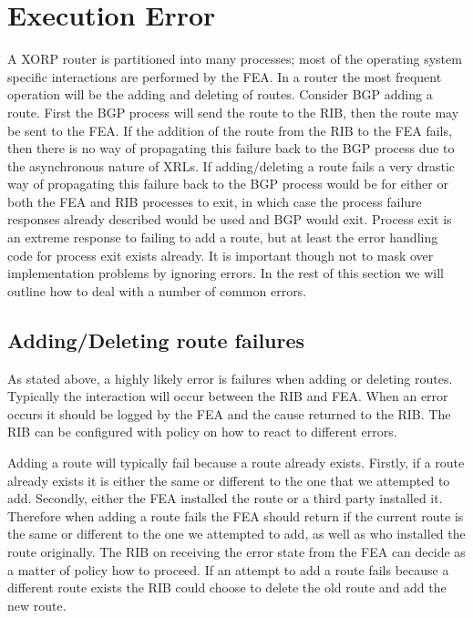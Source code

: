 \documentclass[11pt]{article}
\begin{document}
\section{Execution Error}

A XORP router is partitioned into many processes; most of the operating
system specific interactions are performed by the FEA. In a router the
most frequent operation will be the adding and deleting of routes.
Consider BGP adding a route. First the BGP process will send the route
to the RIB, then the route may be sent to the FEA. If the addition of the
route from the RIB to the FEA fails, then there is no way of
propagating this failure back to the BGP process due to the
asynchronous nature of XRLs. If adding/deleting a route fails a very
drastic way of propagating this failure back to the BGP process would
be for either or both the FEA and RIB processes to exit, in which case
the process failure responses already described would be used and BGP
would exit. Process exit is an extreme response to failing
to add a route, but at least the error handling code for process exit
exists already. It is important though not
to mask over implementation problems by ignoring errors. In the rest
of this section we will outline how to deal with a number of common
errors.

\subsection{Adding/Deleting route failures}

As stated above, a highly likely error is failures when adding or
deleting routes. Typically the interaction will occur between the RIB
and FEA. When an error occurs it should be logged by the FEA and the
cause returned to the RIB. The RIB can be configured with policy on
how to react to different errors.

Adding a route will typically fail because a route already exists.
Firstly, if a route already exists it is either the same or different
to the one that we attempted to add. Secondly, either the FEA
installed the route or a third party installed it. Therefore when
adding a route fails the FEA should return if the current route is the
same or different to the one we attempted to add, as well as who
installed the route originally. The RIB on receiving the error state
from the FEA can decide as a matter of policy how to proceed. If an
attempt to add a route fails because a different route exists the RIB
could choose to delete the old route and add the new route.
\end{document}
